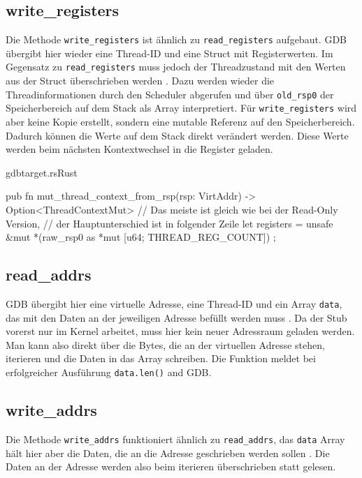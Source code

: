 \subsection{write\_registers}
Die Methode \texttt{write\_registers} ist ähnlich zu \texttt{read\_registers} aufgebaut. GDB übergibt hier wieder eine Thread-ID und eine Struct mit Registerwerten. Im Gegensatz zu \texttt{read\_registers} muss jedoch der Threadzustand mit den Werten aus der Struct überschrieben werden \cite{gdbstub}. Dazu werden wieder die Threadinformationen durch den Scheduler abgerufen und über \texttt{old\_rsp0} der Speicherbereich auf dem Stack als Array interpretiert. Für \texttt{write\_registers} wird aber keine Kopie erstellt, sondern eine mutable Referenz auf den Speicherbereich. Dadurch können die Werte auf dem Stack direkt verändert werden. Diese Werte werden beim nächsten Kontextwechsel in die Register geladen.

\begin{codeblock}{gdbtarget.rs}{Rust}
\begin{rustcode}
pub fn mut_thread_context_from_rsp(rsp: VirtAddr) -> Option<ThreadContextMut> {
	// Das meiste ist gleich wie bei der Read-Only Version,
	// der Hauptunterschied ist in folgender Zeile
	let registers = unsafe { 
		&mut *(raw_rsp0 as *mut [u64; THREAD_REG_COUNT])
	};
}
\end{rustcode}
\end{codeblock}

\subsection{read\_addrs}
GDB übergibt hier eine virtuelle Adresse, eine Thread-ID und ein Array \texttt{data}, das mit den Daten an der jeweiligen Adresse befüllt werden muss \cite{gdbstub}. Da der Stub vorerst nur im Kernel arbeitet, muss hier kein neuer Adressraum geladen werden. Man kann also direkt über die Bytes, die an der virtuellen Adresse stehen, iterieren und die Daten in das Array schreiben. Die Funktion meldet bei erfolgreicher Ausführung \texttt{data.len()} and GDB.

\subsection{write\_addrs}
Die Methode \texttt{write\_addrs} funktioniert ähnlich zu \texttt{read\_addrs}, das \texttt{data} Array hält hier aber die Daten, die an die Adresse geschrieben werden sollen \cite{gdbstub}. Die Daten an der Adresse werden also beim iterieren überschrieben statt gelesen.

